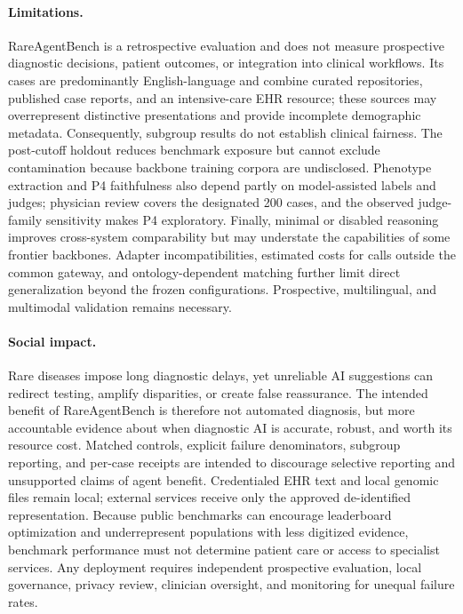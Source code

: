 \documentclass[letterpaper]{article} %
\begin{document}
\paragraph{Limitations.}
RareAgentBench is a retrospective evaluation and does not measure prospective
diagnostic decisions, patient outcomes, or integration into clinical
workflows. Its cases are predominantly English-language and combine curated
repositories, published case reports, and an intensive-care EHR resource;
these sources may overrepresent distinctive presentations and provide
incomplete demographic metadata. Consequently, subgroup results do not
establish clinical fairness. The post-cutoff holdout reduces benchmark
exposure but cannot exclude contamination because backbone training corpora
are undisclosed. Phenotype extraction and P4 faithfulness also depend partly
on model-assisted labels and judges; physician review covers the designated
200 cases, and the observed judge-family sensitivity makes P4 exploratory.
Finally, minimal or disabled reasoning improves cross-system comparability but
may understate the capabilities of some frontier backbones. Adapter
incompatibilities, estimated costs for calls outside the common gateway, and
ontology-dependent matching further limit direct generalization beyond the
frozen configurations. Prospective, multilingual, and multimodal validation
remains necessary.

\paragraph{Social impact.}
Rare diseases impose long diagnostic delays, yet unreliable AI suggestions
can redirect testing, amplify disparities, or create false reassurance. The
intended benefit of RareAgentBench is therefore not automated diagnosis, but
more accountable evidence about when diagnostic AI is accurate, robust, and
worth its resource cost. Matched controls, explicit failure denominators,
subgroup reporting, and per-case receipts are intended to discourage
selective reporting and unsupported claims of agent benefit. Credentialed EHR
text and local genomic files remain local; external services receive only the
approved de-identified representation. Because public benchmarks can
encourage leaderboard optimization and underrepresent populations with less
digitized evidence, benchmark performance must not determine patient care or
access to specialist services. Any deployment requires independent
prospective evaluation, local governance, privacy review, clinician
oversight, and monitoring for unequal failure rates.
\end{document}
